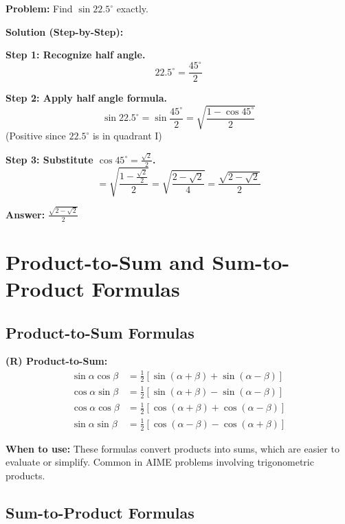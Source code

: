 \documentclass[12pt]{extarticle}
\begin{document}
\begin{examplebox}
\textbf{Problem:} Find $\sin 22.5^\circ$ exactly.

\textbf{Solution (Step-by-Step):}

\textbf{Step 1: Recognize half angle.}
\[
22.5^\circ = \frac{45^\circ}{2}
\]

\textbf{Step 2: Apply half angle formula.}
\[
\sin 22.5^\circ = \sin\frac{45^\circ}{2} = \sqrt{\frac{1 - \cos 45^\circ}{2}}
\]
(Positive since $22.5^\circ$ is in quadrant I)

\textbf{Step 3: Substitute $\cos 45^\circ = \frac{\sqrt{2}}{2}$.}
\[
= \sqrt{\frac{1 - \frac{\sqrt{2}}{2}}{2}} = \sqrt{\frac{2 - \sqrt{2}}{4}} = \frac{\sqrt{2 - \sqrt{2}}}{2}
\]

\textbf{Answer:} $\boxed{\frac{\sqrt{2 - \sqrt{2}}}{2}}$
\end{examplebox}

\section{Product-to-Sum and Sum-to-Product Formulas}

\subsection{Product-to-Sum Formulas}

\begin{theorembox}
\textbf{(R) Product-to-Sum:}
\begin{align}
\sin\alpha\cos\beta &= \frac{1}{2}[\sin(\alpha+\beta) + \sin(\alpha-\beta)] \\
\cos\alpha\sin\beta &= \frac{1}{2}[\sin(\alpha+\beta) - \sin(\alpha-\beta)] \\
\cos\alpha\cos\beta &= \frac{1}{2}[\cos(\alpha+\beta) + \cos(\alpha-\beta)] \\
\sin\alpha\sin\beta &= \frac{1}{2}[\cos(\alpha-\beta) - \cos(\alpha+\beta)]
\end{align}
\end{theorembox}

\begin{remarkbox}
\textbf{When to use:} These formulas convert products into sums, which are easier to evaluate or simplify. Common in AIME problems involving trigonometric products.
\end{remarkbox}

\subsection{Sum-to-Product Formulas}
\end{document}
